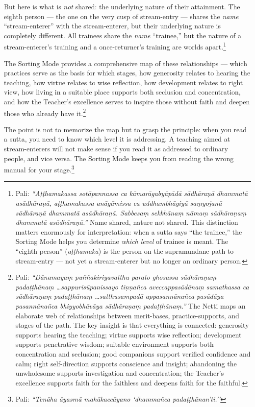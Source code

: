 But here is what is \textit{not} shared: the underlying nature of their attainment. The eighth person --- the one on the very cusp of stream-entry --- shares the \textit{name} ``stream-enterer'' with the stream-enterer, but their underlying nature is completely different. All trainees share the \textit{name} ``trainee,'' but the nature of a stream-enterer's training and a once-returner's training are worlds apart.\footnote{Pali: \textit{``Aṭṭhamakassa sotāpannassa ca kāmarāgabyāpādā sādhāraṇā dhammatā asādhāraṇā, aṭṭhamakassa anāgāmissa ca uddhambhāgiyā saṃyojanā sādhāraṇā dhammatā asādhāraṇā. Sabbesaṃ sekkhānaṃ nāmaṃ sādhāraṇaṃ dhammatā asādhāraṇā.''} Name shared, nature not shared. This distinction matters enormously for interpretation: when a sutta says ``the trainee,'' the Sorting Mode helps you determine \textit{which level} of trainee is meant. The ``eighth person'' (\textit{aṭṭhamaka}) is the person on the supramundane path to stream-entry --- not yet a stream-enterer but no longer an ordinary person.}

The Sorting Mode provides a comprehensive map of these relationships --- which practices serve as the basis for which stages, how generosity relates to hearing the teaching, how virtue relates to wise reflection, how development relates to right view, how living in a suitable place supports both seclusion and concentration, and how the Teacher's excellence serves to inspire those without faith and deepen those who already have it.\footnote{Pali: \textit{``Dānamayaṃ puññakiriyavatthu parato ghosassa sādhāraṇaṃ padaṭṭhānaṃ \ldots sappurisūpanissayo tiṇṇañca aveccappasādānaṃ samathassa ca sādhāraṇaṃ padaṭṭhānaṃ \ldots satthusampadā appasannānañca pasādāya pasannānañca bhiyyobhāvāya sādhāraṇaṃ padaṭṭhānaṃ.''} The Netti maps an elaborate web of relationships between merit-bases, practice-supports, and stages of the path. The key insight is that everything is connected: generosity supports hearing the teaching; virtue supports wise reflection; development supports penetrative wisdom; suitable environment supports both concentration and seclusion; good companions support verified confidence and calm; right self-direction supports conscience and insight; abandoning the unwholesome supports investigation and concentration; the Teacher's excellence supports faith for the faithless and deepens faith for the faithful.}

The point is not to memorize the map but to grasp the principle: when you read a sutta, you need to know which level it is addressing. A teaching aimed at stream-enterers will not make sense if you read it as addressed to ordinary people, and vice versa. The Sorting Mode keeps you from reading the wrong manual for your stage.\footnote{Pali: \textit{``Tenāha āyasmā mahākaccāyano `dhammañca padaṭṭhānan'ti.''}}

